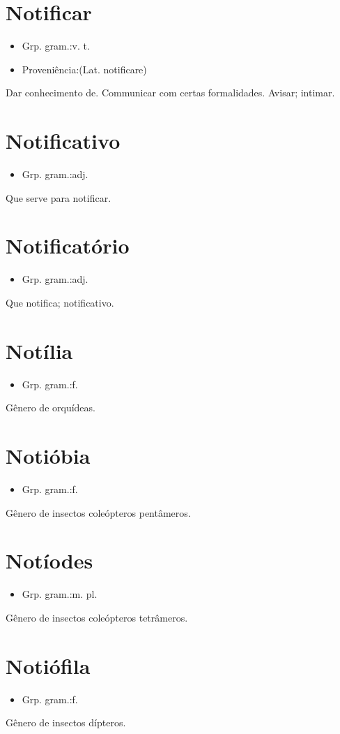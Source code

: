 \section{Notificar}
\begin{itemize}
\item {Grp. gram.:v. t.}
\end{itemize}
\begin{itemize}
\item {Proveniência:(Lat. \textunderscore notificare\textunderscore )}
\end{itemize}
Dar conhecimento de.
Communicar com certas formalidades.
Avisar; intimar.
\section{Notificativo}
\begin{itemize}
\item {Grp. gram.:adj.}
\end{itemize}
Que serve para notificar.
\section{Notificatório}
\begin{itemize}
\item {Grp. gram.:adj.}
\end{itemize}
Que notifica; notificativo.
\section{Notília}
\begin{itemize}
\item {Grp. gram.:f.}
\end{itemize}
Gênero de orquídeas.
\section{Notióbia}
\begin{itemize}
\item {Grp. gram.:f.}
\end{itemize}
Gênero de insectos coleópteros pentâmeros.
\section{Notíodes}
\begin{itemize}
\item {Grp. gram.:m. pl.}
\end{itemize}
Gênero de insectos coleópteros tetrâmeros.
\section{Notiófila}
\begin{itemize}
\item {Grp. gram.:f.}
\end{itemize}
Gênero de insectos dípteros.
